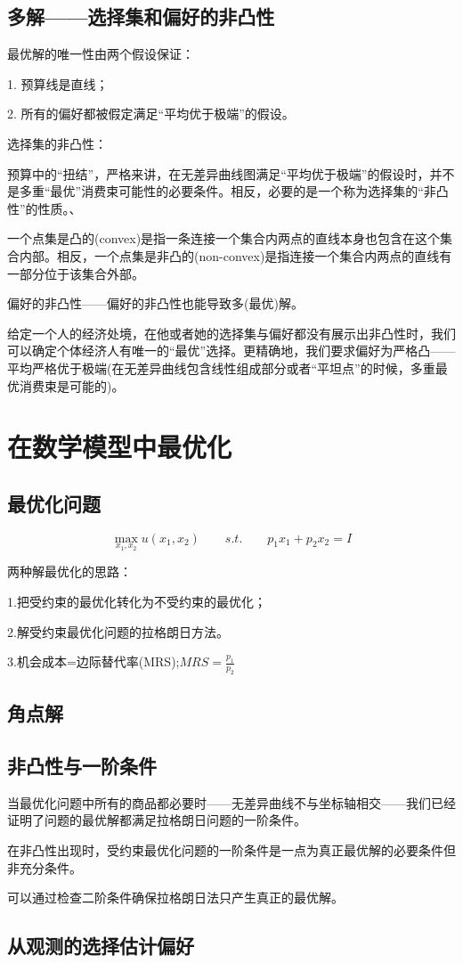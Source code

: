 \documentclass{article}
\begin{document}
\subsection{多解——选择集和偏好的非凸性}
最优解的唯一性由两个假设保证：

1. 预算线是直线；

2. 所有的偏好都被假定满足“平均优于极端”的假设。

\hspace*{\fill}

选择集的非凸性：

预算中的“扭结”，严格来讲，在无差异曲线图满足“平均优于极端”的假设时，并不是多重“最优”消费束可能性的必要条件。相反，必要的是一个称为选择集的“非凸性”的性质。、

\hspace*{\fill}

一个点集是凸的(convex)是指一条连接一个集合内两点的直线本身也包含在这个集合内部。相反，一个点集是非凸的(non-convex)是指连接一个集合内两点的直线有一部分位于该集合外部。

\hspace*{\fill}

偏好的非凸性——偏好的非凸性也能导致多(最优)解。

\hspace*{\fill}

给定一个人的经济处境，在他或者她的选择集与偏好都没有展示出非凸性时，我们可以确定个体经济人有唯一的“最优”选择。更精确地，我们要求偏好为严格凸——平均严格优于极端(在无差异曲线包含线性组成部分或者“平坦点”的时候，多重最优消费束是可能的)。

\section{在数学模型中最优化}
\subsection{最优化问题}
\[
\max\limits_{x_1,x_2} u(x_1,x_2)\qquad s.t.\qquad p_1x_1+p_2x_2=I
\]

两种解最优化的思路：

1.把受约束的最优化转化为不受约束的最优化；

2.解受约束最优化问题的拉格朗日方法。

3.机会成本=边际替代率(MRS);$ MRS=\frac{p_1}{p_2} $

\subsection{角点解}

\subsection{非凸性与一阶条件}

当最优化问题中所有的商品都必要时——无差异曲线不与坐标轴相交——我们已经证明了问题的最优解都满足拉格朗日问题的一阶条件。

在非凸性出现时，受约束最优化问题的一阶条件是一点为真正最优解的必要条件但非充分条件。

可以通过检查二阶条件确保拉格朗日法只产生真正的最优解。

\subsection{从观测的选择估计偏好}
\end{document}
